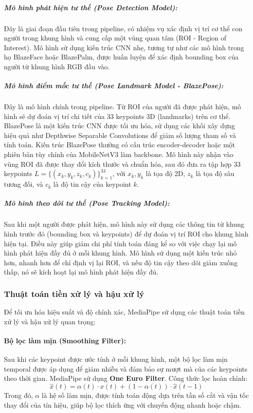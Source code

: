 \subparagraph{Mô hình phát hiện tư thế (Pose Detection Model):} Đây là giai đoạn đầu tiên trong pipeline, có nhiệm vụ xác định vị trí cơ thể con người trong khung hình và cung cấp một vùng quan tâm (ROI - Region of Interest). Mô hình sử dụng kiến trúc CNN nhẹ, tương tự như các mô hình trong họ BlazeFace hoặc BlazePalm, được huấn luyện để xác định bounding box của người từ khung hình RGB đầu vào.

\subparagraph{Mô hình điểm mốc tư thế (Pose Landmark Model - BlazePose):} Đây là mô hình chính trong pipeline. Từ ROI của người đã được phát hiện, mô hình sẽ dự đoán vị trí chi tiết của 33 keypoints 3D (landmarks) trên cơ thể. BlazePose là một kiến trúc CNN được tối ưu hóa, sử dụng các khối xây dựng hiệu quả như Depthwise Separable Convolutions để giảm số lượng tham số và tính toán. Kiến trúc BlazePose thường có cấu trúc encoder-decoder hoặc một phiên bản tùy chỉnh của MobileNetV3 làm backbone. Mô hình này nhận vào vùng ROI đã được thay đổi kích thước và chuẩn hóa, sau đó đưa ra tập hợp 33 keypoints $L = \{(x_k, y_k, z_k, c_k)\}_{k=1}^{33}$, với $x_k, y_k$ là tọa độ 2D, $z_k$ là tọa độ sâu tương đối, và $c_k$ là độ tin cậy của keypoint $k$.

\subparagraph{Mô hình theo dõi tư thế (Pose Tracking Model):} Sau khi một người được phát hiện, mô hình này sử dụng các thông tin từ khung hình trước đó (bounding box và keypoints) để dự đoán vị trí ROI cho khung hình hiện tại. Điều này giúp giảm chi phí tính toán đáng kể so với việc chạy lại mô hình phát hiện đầy đủ ở mỗi khung hình. Mô hình sử dụng một kiến trúc nhỏ hơn, nhanh hơn để chỉ định vị lại ROI, và nếu độ tin cậy theo dõi giảm xuống thấp, nó sẽ kích hoạt lại mô hình phát hiện đầy đủ.

\subsubsection{Thuật toán tiền xử lý và hậu xử lý}

Để tối ưu hóa hiệu suất và độ chính xác, MediaPipe sử dụng các thuật toán tiền xử lý và hậu xử lý quan trọng:

\paragraph{Bộ lọc làm mịn (Smoothing Filter):}
Sau khi các keypoint được ước tính ở mỗi khung hình, một bộ lọc làm mịn temporal được áp dụng để giảm nhiễu và đảm bảo sự mượt mà của các keypoints theo thời gian. MediaPipe sử dụng \textbf{One Euro Filter}. Công thức lọc hoàn chỉnh:
\begin{equation}
\hat{x}(t) = \alpha(t) \cdot x(t) + (1 - \alpha(t)) \cdot \hat{x}(t-1)
\end{equation}
Trong đó, $\alpha$ là hệ số làm mịn, được tính toán động dựa trên tần số cắt và vận tốc thay đổi của tín hiệu, giúp bộ lọc thích ứng với chuyển động nhanh hoặc chậm.

